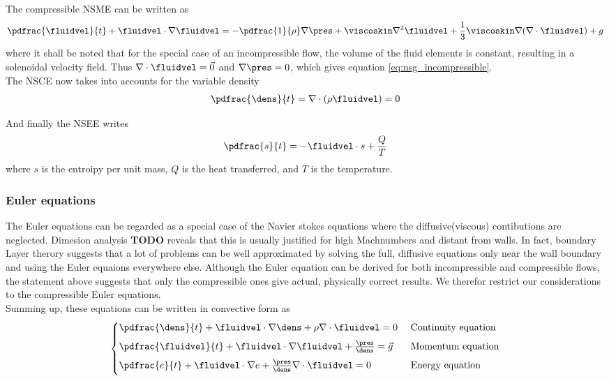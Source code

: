 \documentclass[../main.tex]{subfiles}
\begin{document}
The compressible \ac{NSME} can be written as
\begin{align}\label{eq:nsg_compressible}
\pdfrac{\fluidvel}{t} +
\fluidvel\cdot\nabla\fluidvel =
-\pdfrac{1}{\rho}\nabla\pres +
\viscoskin\nabla^2\fluidvel +
\frac{1}{3} \viscoskin\nabla(\nabla\cdot\fluidvel) +
g
\end{align}
where it shall be noted that for the special case of an incompressible flow, the volume of the fluid elements is constant, resulting in a solenoidal velocity field. Thus $\nabla\cdot\fluidvel=\vec{0}$ and $\nabla\pres=0$, which gives equation \ref{eq:nsg_incompressible}.
\\
The \ac{NSCE} now takes into accounts for the variable density
\begin{align}
\pdfrac{\dens}{t}=\nabla\cdot(\rho\fluidvel)=0
\end{align}

And finally the \ac{NSEE} writes
\begin{align}
\pdfrac{s}{t}=-\fluidvel\cdot s + \frac{Q}{T}
\end{align}
where $s$ is the entroipy per unit mass, $Q$ is the heat transferred, and $T$ is the temperature.


\subsubsection{Euler equations}\label{sec:euler_convective}
The Euler equations can be regarded as a special case of the Navier stokes equations where the diffusive(viscous) contibutions are neglected. Dimesion analysis \textbf{TODO} reveals that this is usually justified for high Machnumbers and distant from walls. In fact, boundary Layer therory suggests that a lot of problems can be well approximated by solving the full, diffusive equations only near the wall boundary and using the Euler equaions everywhere else.
Although the Euler equation can be derived for both incompressible and compressible flows, the statement above suggests that only the compressible ones give actual, physically correct results. We therefor restrict our considerations to the compressible Euler equations.\\
Summing up, these equations can be written in convective form as
\begin{align}
\begin{cases}
\pdfrac{\dens}{t}+\fluidvel\cdot\nabla\dens+\rho\nabla\cdot\fluidvel = 0           &\text{ Continuity equation} \\[0.5em]
\pdfrac{\fluidvel}{t}+\fluidvel\cdot\nabla\fluidvel+\frac{\pres}{\dens} = \vec{g}  &\text{ Momentum equation} \\[0.5em]
\pdfrac{e}{t}+\fluidvel\cdot\nabla e + \frac{\pres}{\dens}\nabla\cdot\fluidvel = 0 &\text{ Energy equation} \\[0.5em]
\end{cases}
\end{align}
\end{document}
